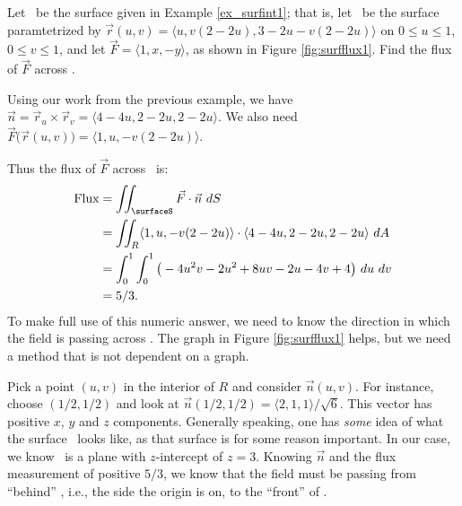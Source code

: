{Let \surfaceS\ be the surface given in Example \ref{ex_surfint1}; that is, let \surfaceS\ be the surface paramtetrized by $\vec r(u,v) = \langle u, v(2-2u),3-2u-v(2-2u)\rangle$ on $0\leq u\leq 1$, $0\leq v\leq 1$, and let $\vec F = \langle 1, x,-y\rangle$, as shown in Figure \ref{fig:surfflux1}. Find the flux of $\vec F$ across \surfaceS.
}
{Using our work from the previous example, we have $\vec n = \vec r_u\times\vec r_v = \langle 4-4u,2-2u,2-2u\rangle$. We also need $\vec F\big(\vec r(u,v)\big) = \langle 1, u, -v(2-2u)\rangle$. 

Thus the flux of $\vec F$ across \surfaceS\ is:
\begin{align*}
\text{Flux} &= \iint_\surfaceS \vec F\cdot \vec n\ dS\\
			&= \iint_R \langle 1,u,-v(2-2u)\rangle\cdot\langle 4-4u,2-2u,2-2u\rangle\ dA \\
			&= \int_0^1\int_0^1 \big(-4u^2v-2u^2+8uv-2u-4v+4\big)\ du\ dv\\
			&= 5/3.
\end{align*}
To make full use of this numeric answer, we need to know the direction in which the field is passing across \surfaceS. The graph in Figure \ref{fig:surfflux1} helps, but we need a method that is not dependent on a graph.

Pick a point $(u,v)$ in the interior of $R$ and consider $\vec n(u,v)$. For instance, choose $(1/2,1/2)$ and look at $\vec n(1/2,1/2) = \langle 2,1,1\rangle/\sqrt{6}$. This vector has positive $x$, $y$ and $z$ components. Generally speaking, one has \emph{some} idea of what the surface \surfaceS\ looks like, as that surface is for some reason important. In our case, we know \surfaceS\ is a plane with $z$-intercept of $z=3$. Knowing $\vec n$ and the flux measurement of positive $5/3$, we know that the field must be passing from ``behind'' \surfaceS, i.e., the side the origin is on, to the ``front'' of \surfaceS.
}\\

